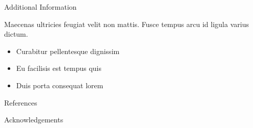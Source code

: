 \documentclass[final]{beamer}
\newlength{\onecolwid}
\begin{document}
\begin{frame}[t]
\begin{columns}[t]
\begin{column}{\onecolwid}
			
			\begin{block}{Additional Information}
				
				Maecenas ultricies feugiat velit non mattis. Fusce tempus arcu id ligula varius dictum. 
				\begin{itemize}
					\item Curabitur pellentesque dignissim
					\item Eu facilisis est tempus quis
					\item Duis porta consequat lorem
				\end{itemize}
				
			\end{block}
			
			
			\begin{block}{References}
				
				\nocite{*} %
				\small{
					\vspace{0.75in}}
				
			\end{block}
			
			
			
			\begin{block}{Acknowledgements}
				
				\small{} \\
				
			\end{block}
			
			

\end{column}
\end{columns}
\end{frame}
\end{document}
